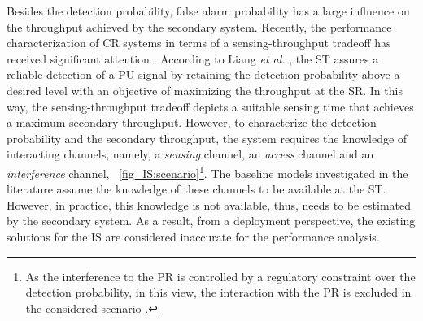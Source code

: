 Besides the detection probability, false alarm probability has a large influence on the throughput achieved by the secondary system. %
Recently, the performance characterization of CR systems in terms of a sensing-throughput tradeoff has received significant attention \cite{Liang08, Juarez11, Sharkasi12, Pradhan15}. According to Liang \textit{et al.} \cite{Liang08}, the ST assures a reliable detection of a PU signal by retaining the detection probability above a desired level with an objective of maximizing the throughput at the SR. In this way, the sensing-throughput tradeoff depicts a suitable sensing time that achieves a maximum secondary throughput. However, to characterize the detection probability and the secondary throughput, the system requires the knowledge of interacting channels, namely, a \textit{sensing} channel, an \textit{access} channel and an \textit{interference} channel,  \figurename~\ref{fig_IS:scenario}\footnote{As the interference to the PR is controlled by a regulatory constraint over the detection probability, in this view, the interaction with the PR is excluded in the considered scenario \cite{Liang08}.}. The baseline models investigated in the literature assume the knowledge of these channels to be available at the ST. 
However, in practice, this knowledge is not available, thus, needs to be estimated by the secondary system. As a result, from a deployment perspective, the existing solutions for the IS are considered inaccurate for the performance analysis. 


